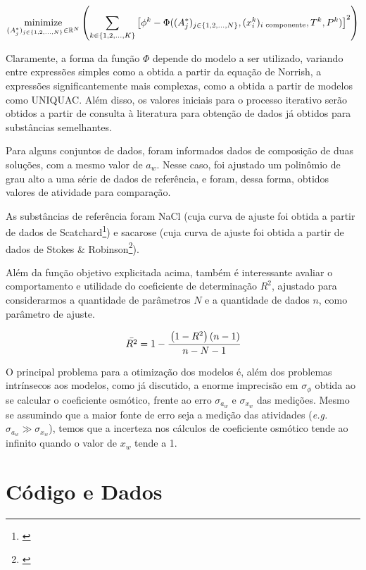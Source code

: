 \begin{equation}
	\label{eq:min_quad_lev}
	\minimize_{(A_j^*)_{j \in \{1,2,\ldots,N\}} \in \mathbb{R}^N}%
	\left(\sum_{k \in \{1,2,\ldots,K\}}\left[\phi^k - \Phi((A^*_j)_{j%
	\in \{1, 2, \ldots, N\}}, (x^k_i)_\text{$i$ componente},%
	T^k, P^k)\right]^2\right)
\end{equation}

Claramente, a forma da função $\Phi$ depende do modelo a ser utilizado, variando
entre expressões simples como a obtida a partir da equação de Norrish, a
expressões significantemente mais complexas, como a obtida a partir de modelos
como UNIQUAC. Além disso, os valores iniciais para o processo iterativo serão
obtidos a partir de consulta à literatura para obtenção de dados já obtidos para
substâncias semelhantes.

Para alguns conjuntos de dados, foram informados dados de composição de duas
soluções, com a mesmo valor de $a_w$. Nesse caso, foi ajustado um polinômio
de grau alto a uma série de dados de referência, e foram, dessa forma, obtidos
valores de atividade para comparação.

As substâncias de referência foram NaCl (cuja curva de ajuste foi obtida a
partir de dados de Scatchard\footnote{\cite{scatchard1938}}) e sacarose (cuja
curva de ajuste foi obtida a partir de dados de Stokes \& Robinson\footnote{%
\cite{stokes1961}}).

Além da função objetivo explicitada acima, também é interessante avaliar o
comportamento e utilidade do coeficiente de determinação $R^2$, ajustado para
considerarmos a quantidade de parâmetros $N$ e a quantidade de dados $n$, como
parâmetro de ajuste.

\begin{equation}
	\bar{R^2} = 1 - \cfrac{\left( 1 - R^2 \right) \left( n - 1 \right)}
		{n - N - 1}
\end{equation}

O principal problema para a otimização dos modelos é, além dos problemas
intrínsecos aos modelos, como já discutido, a enorme imprecisão em
$\sigma_\phi$ obtida ao se calcular o coeficiente osmótico, frente ao erro
$\sigma_{a_w}$ e $\sigma_{x_w}$ das medições. Mesmo se assumindo que a maior
fonte de erro seja a medição das atividades (\textit{e.g.} $\sigma_{a_w} \gg
\sigma_{x_w}$), temos que a incerteza nos cálculos de coeficiente osmótico
tende ao infinito quando o valor de $x_w$ tende a 1.

\chapter{Código e Dados}

